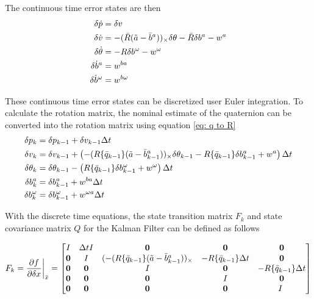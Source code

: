 The continuous time error states are then
\begin{subequations}
    \begin{align}
        \delta \dot{p} &= \delta v \label{eq: error p cont}\\
        \delta \dot{v} &=  -(\bar{R} (\Tilde{a} - \bar{b}^a))_{\times} \delta \theta - \bar{R} \delta b^a - w^a \label{eq: error v cont}\\
        \delta \dot{\theta} &= -R \delta b^{\omega} - w^{\omega} \label{eq: error theta cont}\\
        \delta \dot{b}^a &= w^{ba} \label{eq: error b^{a} cont}\\
        \delta \dot{b}^{\omega} &= w^{b \omega} \label{eq: error b^{ba} cont}
    \end{align}
\end{subequations}


These continuous time error states can be discretized user Euler integration. To calculate the rotation matrix, the nominal estimate of the quaternion can be converted into the rotation matrix using equation \eqref{eq: q to R}
\begin{subequations}
    \begin{align}
        \delta p_k &= \delta p_{k-1} + \delta v_{k-1} \Delta t \label{eq: discrete error p}\\
        \delta v_k &= \delta v_{k-1} + \left( -(R\{\bar{q}_{k-1}\} (\Tilde{a} - \bar{b}^a_{k-1}))_{\times} \delta \theta_{k-1} - R\{\bar{q}_{k-1}\} \delta b^a_{k-1} + w^a \right) \Delta t \label{eq: discrete error v}\\
        \delta \theta_k &= \delta \theta_{k-1} - \left( R\{\bar{q}_{k-1}\} \delta b^{\omega}_{k-1} + w^{\omega} \right) \Delta t \label{eq: discrete error theta}\\
        \delta b^a_k &= \delta b^a_{k-1} + w^{ba} \Delta t \label{eq: discrete error bias accel}\\
        \delta b^{\omega}_k &= \delta b^{\omega}_{k-1} + w^{\omega a} \Delta t \label{eq: discrete error bias omega}
    \end{align}
\end{subequations}


With the discrete time equations, the state transition matrix $F_k$ and state covariance matrix $Q$ for the Kalman Filter can be defined as follows

\begin{equation}
    F_k = \frac{\partial f}{\partial \delta x} \bigg|_{\bar{x}}= 
    \begin{bmatrix}
        I & \Delta t I & \mathbf{0} & \mathbf{0} & \mathbf{0} \\
        \mathbf{0} & I & (-(R\{\bar{q}_{k-1}\} (\Tilde{a} - \bar{b}^a_{k-1}))_{\times} & -R\{\bar{q}_{k-1}\} \Delta t& \mathbf{0} \\
        \mathbf{0} & \mathbf{0} & I & \mathbf{0} & -R\{\bar{q}_{k-1}\} \Delta t\\
        \mathbf{0} & \mathbf{0} & \mathbf{0} & I & \mathbf{0}\\
        \mathbf{0} & \mathbf{0} & \mathbf{0} & \mathbf{0} & I\
    \end{bmatrix}
    \label{eq: quaternion F}
\end{equation}

